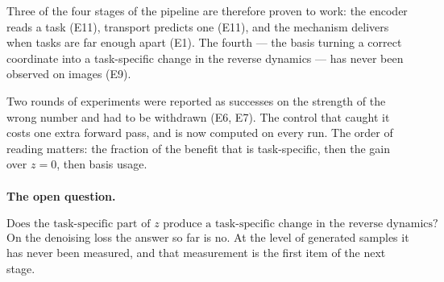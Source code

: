\documentclass[11pt]{article}
\begin{document}
Three of the four stages of the pipeline are therefore proven to work: the encoder reads a
task (E11), transport predicts one (E11), and the mechanism delivers when tasks are far
enough apart (E1). The fourth --- the basis turning a correct coordinate into a
task-specific change in the reverse dynamics --- has never been observed on images (E9).

Two rounds of experiments were reported as successes on the strength of the wrong number
and had to be withdrawn (E6, E7). The control that caught it costs one extra forward pass,
and is now computed on every run. The order of reading matters: the fraction of the
benefit that is task-specific, then the gain over $z = 0$, then basis usage.

\paragraph{The open question.}
\[
\boxed{\text{Does the task-specific part of } z \text{ produce a task-specific change in the reverse dynamics?}}
\]
On the denoising loss the answer so far is no. At the level of generated samples it has
never been measured, and that measurement is the first item of the next stage.
\end{document}

